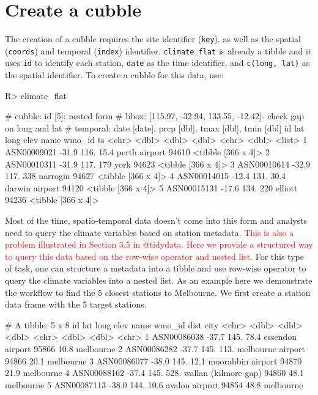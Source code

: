 \documentclass[
]{jss}
\begin{document}
\newpage

\hypertarget{create-a-cubble}{%
\section{Create a cubble}\label{create-a-cubble}}

The creation of a cubble requires the site identifier (\texttt{key}), as
well as the spatial (\texttt{coords}) and temporal (\texttt{index})
identifier. \texttt{climate\_flat} is already a tibble and it uses
\texttt{id} to identify each station, \texttt{date} as the time
identifier, and \texttt{c(long,\ lat)} as the spatial identifier. To
create a cubble for this data, use:

\begin{CodeChunk}
\begin{CodeInput}
R> climate_flat %
\end{CodeInput}
\begin{CodeOutput}
# cubble:   id [5]: nested form
# bbox:     [115.97, -32.94, 133.55, -12.42]- check gap on long and lat
# temporal: date [date], prcp [dbl], tmax [dbl], tmin [dbl]
  id            lat  long  elev name           wmo_id ts                
  <chr>       <dbl> <dbl> <dbl> <chr>           <dbl> <list>            
1 ASN00009021 -31.9  116.  15.4 perth airport   94610 <tibble [366 x 4]>
2 ASN00010311 -31.9  117. 179   york            94623 <tibble [366 x 4]>
3 ASN00010614 -32.9  117. 338   narrogin        94627 <tibble [366 x 4]>
4 ASN00014015 -12.4  131.  30.4 darwin airport  94120 <tibble [366 x 4]>
5 ASN00015131 -17.6  134. 220   elliott         94236 <tibble [366 x 4]>
\end{CodeOutput}
\end{CodeChunk}

Most of the time, spatio-temporal data doesn't come into this form and
analysts need to query the climate variables based on station metadata.
\textcolor{red}{This is also a problem illustrated in Section 3.5 in @tidydata. Here we provide a structured way to query this data based on the row-wise operator and nested list.}
For this type of task, one can structure a metadata into a tibble and
use row-wise operator to query the climate variables into a nested list.
As an example here we demonstrate the workflow to find the 5 closest
stations to Melbourne. We first create a station data frame with the 5
target stations.

\begin{CodeChunk}
\begin{CodeOutput}
# A tibble: 5 x 8
  id            lat  long  elev name                 wmo_id  dist city     
  <chr>       <dbl> <dbl> <dbl> <chr>                 <dbl> <dbl> <chr>    
1 ASN00086038 -37.7  145.  78.4 essendon airport      95866  10.8 melbourne
2 ASN00086282 -37.7  145. 113.  melbourne airport     94866  20.1 melbourne
3 ASN00086077 -38.0  145.  12.1 moorabbin airport     94870  21.9 melbourne
4 ASN00088162 -37.4  145. 528.  wallan (kilmore gap)  94860  48.1 melbourne
5 ASN00087113 -38.0  144.  10.6 avalon airport        94854  48.8 melbourne
\end{CodeOutput}
\end{CodeChunk}
\end{document}
